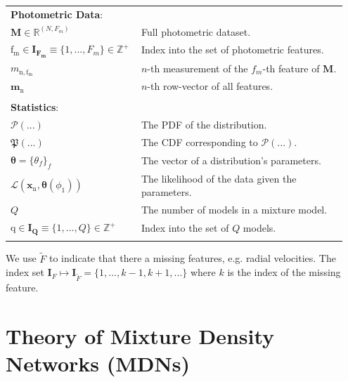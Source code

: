 \documentclass[twocolumn]{aastex631}
\newcommand{\mrm}[1]{\mathrm{#1}}
\newcommand{\mbs}[1]{\boldsymbol{#1}}
\newcommand{\mbf}[1]{\mathbf{#1}}
\newcommand{\mbb}[1]{\mathbb{#1}}
\newcommand{\mfk}[1]{\mathfrak{#1}}
\newcommand{\mcal}[1]{\mathcal{#1}}
\newcommand{\pdf}{\mcal{P}}
\newcommand{\cdf}{\mfk{P}}
\newcommand{\nth}[1]{{#1}_{\mrm{n}}}  %
\begin{document}
\begin{table}
\begin{tabular}{p{0.35\linewidth} p{0.6\linewidth}}
    \\
    \multicolumn{2}{l}{\textbf{Photometric Data}:}  \vspace{5pt} \\
    $\mbf{M} \in \mathbb{R}^{(N, F_m)}$ & Full photometric dataset. \\
    $\mrm{f_m} \in \mbs{I_{F_m}} \equiv \{1, ..., F_m\} \in \mathbb{Z^+}$ & Index into the set of photometric features. \\
    $m_{\mrm{n,f_m}}$ & $n$-th measurement of the $f_m$-th feature of $\mbf{M}$. \\
    $\nth{\mbs{m}}$ & $n$-th row-vector of all features. \\
    \\
    \multicolumn{2}{l}{\textbf{Statistics}:} \\
    \midrule
    $\pdf(...)$ & The PDF of the distribution. \\
    $\cdf(...)$ & The CDF corresponding to $\pdf(...)$. \\
    $\mbs{\theta} = \{\theta_f\}_f$ & The vector of a distribution's parameters. \\
    $\mcal{L}(\nth{\mbf{x}}, \mbs{\theta}(\phi_1))$ & The likelihood of the data given the parameters. \\
    $Q$ & The number of models in a mixture model. \\
    $\mrm{q} \in \mbs{I_Q} \equiv \{1, ..., Q \} \in \mbb{Z^+}$ & Index into the set of $Q$ models. \\
    \\
    \end{tabular}
    \end{table}

    We use $\tilde{F}$ to indicate that there a missing features, e.g. radial velocities.
    The index set $\mbs{I}_F \mapsto \mbs{I}_{\tilde{F}} = \{1, ..., k-1, k+1, ... \}$ where $k$ is the index of the missing feature.



\section{Theory of Mixture Density Networks (MDNs)} \label{app:theory_of_mixture_density_networks}
\end{document}
